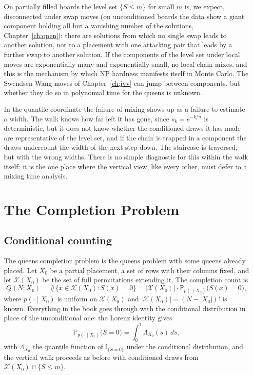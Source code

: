 \documentclass[11pt,twoside,openany]{book}
\theoremstyle{plain}
\theoremstyle{definition}
\theoremstyle{remark}
\newcommand{\PP}{\mathbb{P}}
\newcommand{\Ind}{\mathbb{I}}
\newcommand{\cX}{\mathcal{X}}
\newcommand{\NP}{\mathrm{NP}}
\begin{document}
On partially filled boards the level set $\{ S \le m \}$ for small $m$ is, we expect, disconnected under swap moves (on unconditioned boards the data show a giant component holding all but a vanishing number of the solutions, Chapter~\ref{ch:open}): there are solutions from which no single swap leads to another solution, nor to a placement with one attacking pair that leads by a further swap to another solution. If the components of the level set under local moves are exponentially many and exponentially small, no local chain mixes, and this is the mechanism by which $\NP$ hardness manifests itself in Monte Carlo. The Swendsen Wang moves of Chapter~\ref{ch:jvv} can jump between components, but whether they do so in polynomial time for the queens is unknown.

In the quantile coordinate the failure of mixing shows up as a failure to estimate a width. The walk knows how far left it has gone, since $s_k = e^{-k/n}$ is deterministic, but it does not know whether the conditioned draws it has made are representative of the level set, and if the chain is trapped in a component the draws undercount the width of the next step down. The staircase is traversed, but with the wrong widths. There is no simple diagnostic for this within the walk itself; it is the one place where the vertical view, like every other, must defer to a mixing time analysis.



















\chapter{The Completion Problem}
\label{ch:completion}

\section{Conditional counting}

The queens completion problem is the queens problem with some queens already placed. Let $X_0$ be a partial placement, a set of rows with their columns fixed, and let $\cX(X_0)$ be the set of full permutations extending it. The completion count is
\[
Q(N; X_0) = \#\{ x \in \cX(X_0) : S(x) = 0 \} = |\cX(X_0)| \cdot \PP_{p(\cdot \mid X_0)}\big( S(x) = 0 \big) ,
\]
where $p(\cdot \mid X_0)$ is uniform on $\cX(X_0)$ and $|\cX(X_0)| = (N - |X_0|)!$ is known. Everything in the book goes through with the conditional distribution in place of the unconditional one: the Lorenz identity gives
\[
\PP_{p(\cdot \mid X_0)}\big( S = 0 \big) = \int_0^1 \Lambda_{X_0}(s) \, ds ,
\]
with $\Lambda_{X_0}$ the quantile function of $\Ind_{\{S = 0\}}$ under the conditional distribution, and the vertical walk proceeds as before with conditioned draws from $\cX(X_0) \cap \{ S \le m \}$.
\end{document}
